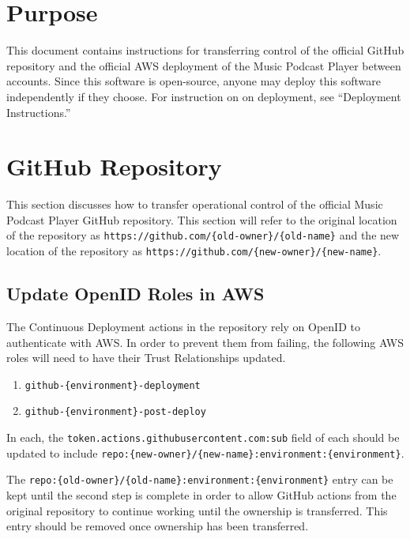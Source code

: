 \documentclass{article}
\begin{document}
\section{Purpose}


This document contains instructions for transferring 
control of the official GitHub repository and the official
AWS deployment of the Music Podcast Player between
accounts. Since this software is open-source, anyone may
deploy this software independently if they choose. For
instruction on on deployment, see ``Deployment 
Instructions.''

\section{GitHub Repository}

This section discusses how to transfer operational 
control of the official Music Podcast Player GitHub
repository. This section will refer to the original
location of the repository as
\verb|https://github.com/{old-owner}/{old-name}| and the
new location of the repository as
\verb|https://github.com/{new-owner}/{new-name}|.

\subsection{Update OpenID Roles in AWS}
The Continuous Deployment actions in the repository rely
on OpenID to authenticate with AWS. In order to prevent
them from failing, the following AWS roles will need to
have their Trust Relationships updated.

\begin{enumerate}
    \item \verb|github-{environment}-deployment|
    \item \verb|github-{environment}-post-deploy|
\end{enumerate}

In each, the
\verb|token.actions.githubusercontent.com:sub| field of
each should be updated to include
\verb|repo:{new-owner}/{new-name}:environment:{environment}|.

The \verb|repo:{old-owner}/{old-name}:environment:{environment}|
entry can be kept until the second step is complete in
order to allow GitHub actions from the original repository
to continue working until the ownership is transferred. 
This entry should be removed once ownership has been
transferred.
\end{document}
